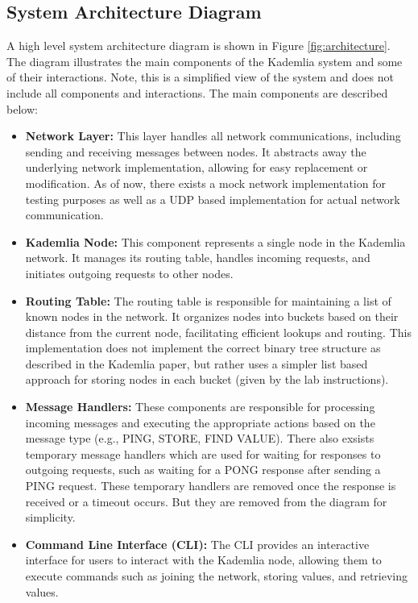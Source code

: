 \subsection{System Architecture Diagram}
A high level system architecture diagram is shown in Figure \ref{fig:architecture}. The diagram illustrates the main components of the Kademlia system and some of their interactions. Note, this is a simplified view of the system and does not include all components and interactions. The main components are described below:
\begin{itemize}
    \item \textbf{Network Layer:} This layer handles all network communications, including sending and receiving messages between nodes. It abstracts away the underlying network implementation, allowing for easy replacement or modification. As of now, there exists a mock network implementation for testing purposes as well as a UDP based implementation for actual network communication.
    \item \textbf{Kademlia Node:} This component represents a single node in the Kademlia network. It manages its routing table, handles incoming requests, and initiates outgoing requests to other nodes.
    \item \textbf{Routing Table:} The routing table is responsible for maintaining a list of known nodes in the network. It organizes nodes into buckets based on their distance from the current node, facilitating efficient lookups and routing. This implementation does not implement the correct binary tree structure as described in the Kademlia paper, but rather uses a simpler list based approach for storing nodes in each bucket (given by the lab instructions).
    \item \textbf{Message Handlers:} These components are responsible for processing incoming messages and executing the appropriate actions based on the message type (e.g., PING, STORE, FIND VALUE). There also exsists temporary message handlers which are used for waiting for responses to outgoing requests, such as waiting for a PONG response after sending a PING request. These temporary handlers are removed once the response is received or a timeout occurs. But they are removed from the diagram for simplicity.
    \item \textbf{Command Line Interface (CLI):} The CLI provides an interactive interface for users to interact with the Kademlia node, allowing them to execute commands such as joining the network, storing values, and retrieving values.
    
\end{itemize}

